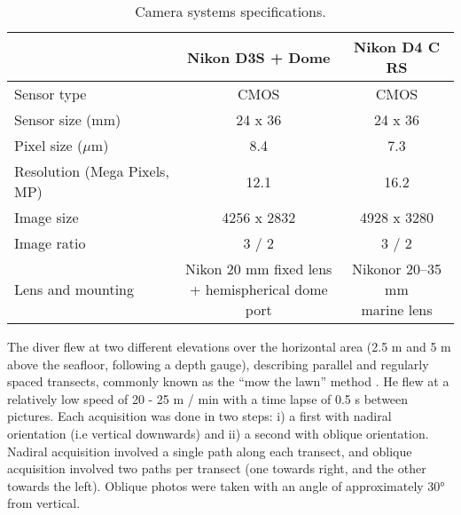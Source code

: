 \begin{table}[H]
  \centering
  \normalsize
  \caption{Camera systems specifications.}
  \label{table2.1}
    \begin{tabular}{lcc} %
        \toprule
        \textbf{}	& \textbf{Nikon D3S + Dome}	& \textbf{Nikon D4 C RS}\\
        \midrule
        Sensor type		& CMOS			& CMOS\\
        Sensor size (mm)		& 24 x 36			& 24 x 36\\
        Pixel size ($\mu$m)     & 8.4       & 7.3\\
        Resolution (Mega Pixels, MP)		& 12.1			& 16.2\\
        Image size		& 4256 x 2832			& 4928 x 3280\\
        Image ratio		& 3 / 2			& 3 / 2\\
        Lens and mounting		& \makecell[c]{Nikon 20 mm fixed lens \\ + hemispherical
        dome port}			& \makecell[c]{Nikonor 20–35 mm \\ marine lens}\\
        \bottomrule
    \end{tabular}
\end{table}

The diver flew at two different elevations over the horizontal area (2.5 m and 5 m above the seafloor, following a depth gauge), describing parallel and regularly spaced transects, commonly known as the “mow the lawn” method \citep{pizarro_simple_2017}. He flew at a relatively low speed of 20 - 25 m / min with a time lapse of 0.5 s between pictures. Each acquisition was done in two steps: i) a first with nadiral orientation (i.e vertical downwards) and ii) a second with oblique orientation. Nadiral acquisition involved a single path along each transect, and oblique acquisition involved two paths per transect (one towards right, and the other towards the left). Oblique photos were taken with an angle of approximately 30° from vertical.

